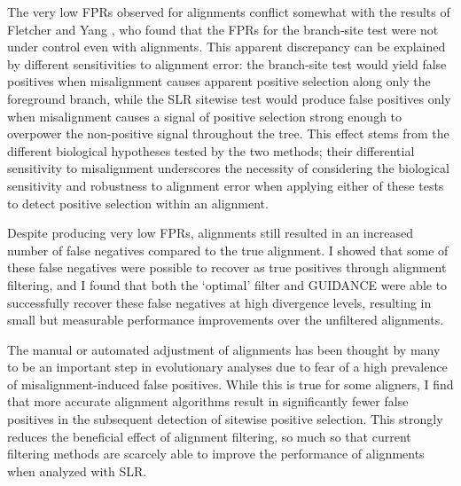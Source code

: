 The very low FPRs observed for \prankc alignments conflict somewhat
with the results of Fletcher and Yang
\citeyearpar{Fletcher2010Effect}, who found that the FPRs for the
branch-site test were not under control even with \prankc
alignments. This apparent discrepancy can be explained by different
sensitivities to alignment error: the branch-site test would yield
false positives when misalignment causes apparent positive selection
along only the foreground branch, while the SLR sitewise test would
produce false positives only when misalignment causes a signal of
positive selection strong enough to overpower the non-positive signal
throughout the tree. This effect stems from the different biological
hypotheses tested by the two methods; their differential sensitivity
to misalignment underscores the necessity of considering the
biological sensitivity and robustness to alignment error when applying
either of these tests to detect positive selection within an
alignment. 

Despite producing very low FPRs, \prankc alignments still resulted in
an increased number of false negatives compared to the true
alignment. I showed that some of these false negatives were possible
to recover as true positives through alignment filtering, and I found
that both the `optimal' filter and GUIDANCE were able to successfully
recover these false negatives at high divergence levels, resulting in
small but measurable performance improvements over the unfiltered
\prankc alignments.

The manual or automated adjustment of alignments has been thought by
many to be an important step in evolutionary analyses due to fear of a
high prevalence of misalignment-induced false positives. While this is
true for some aligners, I find that more accurate alignment
algorithms result in significantly fewer false positives in the
subsequent detection of sitewise positive selection. This strongly
reduces the beneficial effect of alignment filtering, so much so that
current filtering methods are scarcely able to improve the
performance of \prankc alignments when analyzed with SLR.

